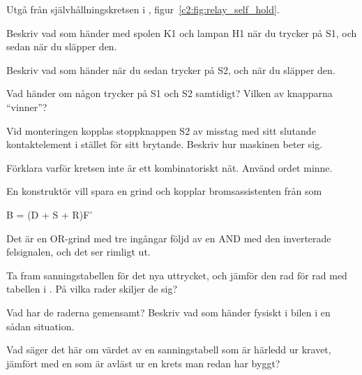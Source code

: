 \label{c2:ex:12}
Utgå från självhållningskretsen i , figur~\ref{c2:fig:relay_self_hold}.
\begin{parts}
  \item Beskriv vad som händer med spolen K1 och lampan H1 när du trycker på S1, och sedan när du
    släpper den.
  \item Beskriv vad som händer när du sedan trycker på S2, och när du släpper den.
  \item Vad händer om någon trycker på S1 och S2 samtidigt? Vilken av knapparna \enquote{vinner}?
  \item Vid monteringen kopplas stoppknappen S2 av misstag med sitt slutande kontaktelement i
    stället för sitt brytande. Beskriv hur maskinen beter sig.
  \item Förklara varför kretsen inte är ett kombinatoriskt nät. Använd ordet minne.
\end{parts}

\label{c2:ex:13}
En konstruktör vill spara en grind och kopplar bromsassistenten från  som

\begin{console}
B = (D + S + R)F'
\end{console}

\noindent Det är en OR-grind med tre ingångar följd av en AND med den inverterade felsignalen, och
det ser rimligt ut.
\begin{parts}
  \item Ta fram sanningstabellen för det nya uttrycket, och jämför den rad för rad med tabellen i
    . På vilka rader skiljer de sig?
  \item Vad har de raderna gemensamt? Beskriv vad som händer fysiskt i bilen i en sådan situation.
  \item Vad säger det här om värdet av en sanningstabell som är härledd ur kravet, jämfört med en
    som är avläst ur en krets man redan har byggt?
\end{parts}
